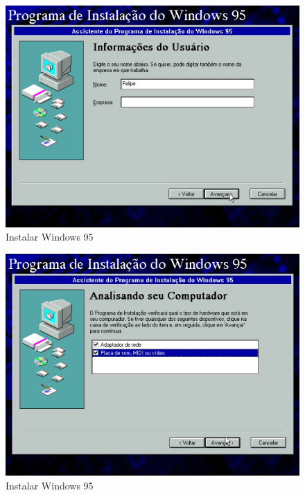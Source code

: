 \documentclass{report}
\begin{document}
\begin{figure}
\centering
\includegraphics[width=\textwidth]{Screenshot_36.png}
\caption{Instalar Windows 95}
\label{fig:36}
\end{figure}

\begin{figure}
\centering
\includegraphics[width=\textwidth]{Screenshot_37.png}
\caption{Instalar Windows 95}
\label{fig:37}
\end{figure}
\end{document}
